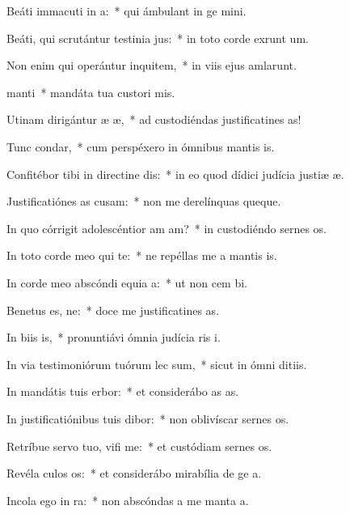 \item Beáti immacuti in a:~* qui ámbulant in ge mini.
\item Beáti, qui scrutántur testinia jus:~* in toto corde exrunt um.
\item Non enim qui operántur inquitem,~* in viis ejus amlarunt.
\item {} manti~* mandáta tua custori mis.
\item Utinam dirigántur æ æ,~* ad custodiéndas justificatines as!
\item Tunc  condar,~* cum perspéxero in ómnibus mantis is.
\item Confitébor tibi in directine dis:~* in eo quod dídici judícia justiæ æ.
\item Justificatiónes as cusam:~* non me derelínquas queque.
\item In quo córrigit adolescéntior am am?~* in custodiéndo sernes os.
\item In toto corde meo qui te:~* ne repéllas me a mantis is.
\item In corde meo abscóndi equia a:~* ut non cem bi.
\item Benetus es, ne:~* doce me justificatines as.
\item In biis is,~* pronuntiávi ómnia judícia ris i.
\item In via testimoniórum tuórum lec sum,~* sicut in ómni ditiis.
\item In mandátis tuis erbor:~* et considerábo as as.
\item In justificatiónibus tuis dibor:~* non oblivíscar sernes os.
\item Retríbue servo tuo, vifi me:~* et custódiam sernes os.
\item Revéla culos os:~* et considerábo mirabília de ge a.
\item Incola ego  in ra:~* non abscóndas a me manta a.
